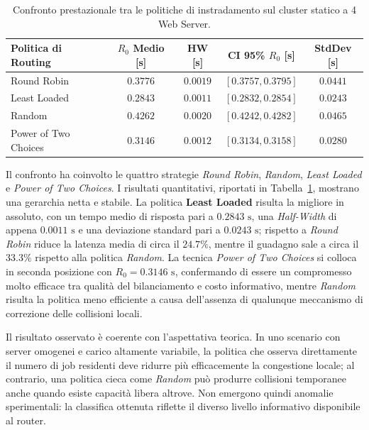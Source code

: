 ﻿\documentclass[a4paper,12pt]{article}
\begin{document}
\begin{table}[H]
    \centering
    \small
    \renewcommand{\arraystretch}{1.3}
    \begin{tabular}{lcccc}
        \hline
        \textbf{Politica di Routing} & \textbf{$R_0$ Medio [s]} & \textbf{HW [s]} & \textbf{CI 95\% $R_0$ [s]} & \textbf{StdDev [s]} \\ \hline
        Round Robin                  & $0.3776$                & $0.0019$        & $[0.3757, 0.3795]$         & $0.0441$            \\
        Least Loaded                 & $0.2843$                & $0.0011$        & $[0.2832, 0.2854]$         & $0.0243$            \\
        Random                       & $0.4262$                & $0.0020$        & $[0.4242, 0.4282]$         & $0.0465$            \\
        Power of Two Choices         & $0.3146$                & $0.0012$        & $[0.3134, 0.3158]$         & $0.0280$            \\ \hline
    \end{tabular}
    \caption{Confronto prestazionale tra le politiche di instradamento sul cluster statico a 4 Web Server.}
    \label{tab:routing_policy_results}
\end{table}

Il confronto ha coinvolto le quattro strategie \textit{Round Robin}, \textit{Random}, \textit{Least Loaded} e \textit{Power of Two Choices}. I risultati quantitativi, riportati in Tabella~\ref{tab:routing_policy_results}, mostrano una gerarchia netta e stabile. La politica \textbf{Least Loaded} risulta la migliore in assoluto, con un tempo medio di risposta pari a $0.2843\text{ s}$, una \textit{Half-Width} di appena $0.0011\text{ s}$ e una deviazione standard pari a $0.0243\text{ s}$; rispetto a \textit{Round Robin} riduce la latenza media di circa il $24.7\%$, mentre il guadagno sale a circa il $33.3\%$ rispetto alla politica \textit{Random}. La tecnica \textit{Power of Two Choices} si colloca in seconda posizione con $R_0 = 0.3146\text{ s}$, confermando di essere un compromesso molto efficace tra qualità del bilanciamento e costo informativo, mentre \textit{Random} risulta la politica meno efficiente a causa dell'assenza di qualunque meccanismo di correzione delle collisioni locali.

Il risultato osservato è coerente con l'aspettativa teorica. In uno scenario con server omogenei e carico altamente variabile, la politica che osserva direttamente il numero di job residenti deve ridurre più efficacemente la congestione locale; al contrario, una politica cieca come \textit{Random} può produrre collisioni temporanee anche quando esiste capacità libera altrove. Non emergono quindi anomalie sperimentali: la classifica ottenuta riflette il diverso livello informativo disponibile al router.
\end{document}
